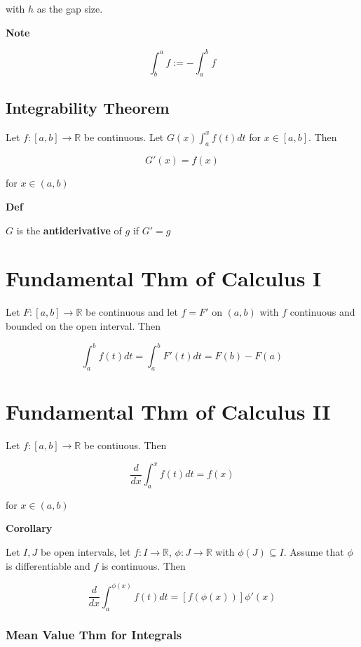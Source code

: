 \documentclass[12pt,letterpaper]{article}
\newcommand{\R}{{\mathbb R}}
\begin{document}
\begin{multicols*}{2}
        with $h$ as the gap size.

        {\bf Note}

        \[
          \int_b^a f := - \int_a^b f
        \]

        \subsection{Integrability Theorem}

        Let $f: [a, b] \rightarrow \R$ be continuous. Let $G(x) \int_a^x f(t)dt$
        for $x \in [a, b]$. Then

        \[
          G'(x) = f(x)
        \]

        for $x \in (a, b)$

        {\bf Def}

        $G$ is the {\bf antiderivative} of $g$ if $G' = g$

        \section{Fundamental Thm of Calculus I}

        Let $F: [a, b] \to \R$ be continuous and let $f = F'$ on $(a, b)$ with
        $f$ continuous and bounded on the open interval. Then
        
        \[
          \int_a^b f(t) dt = \int_a^b F'(t) dt = F(b) - F(a)
        \]

        \section{Fundamental Thm of Calculus II}

        Let $f: [a, b] \rightarrow \R$ be contiuous. Then

        \[
          \frac{d}{dx} \int_a^x f(t) dt = f(x)
        \]

        for $x \in (a, b)$

        {\bf Corollary}

        Let $I, J$ be open intervals, let $f: I \rightarrow \R$, $\phi: J
        \rightarrow \R$ with $\phi(J) \subseteq I$. Assume that $\phi$ is
        differentiable and $f$ is continuous. Then

        \[
          \frac{d}{dx} \int_a^{\phi(x)} f(t) dt = [f(\phi(x))]\phi'(x)
        \]


        \subsubsection{Mean Value Thm for Integrals}


\end{multicols*}
\end{document}
